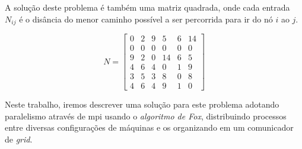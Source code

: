 A solução deste problema é também uma matriz quadrada, onde cada entrada \(N_{ij}\) é o disância do menor caminho
possível a ser percorrida para ir do nó \(i\) ao \(j\).

\[N = 
\begin{bmatrix}
	0 & 2 & 9 & 5  & 6 & 14 \\
	0 & 0 & 0 & 0  & 0 & 0  \\
	9 & 2 & 0 & 14 & 6 & 5  \\
	4 & 6 & 4 & 0  & 1 & 9  \\
	3 & 5 & 3 & 8  & 0 & 8  \\
	4 & 6 & 4 & 9  & 1 & 0
\end{bmatrix}
\]

Neste trabalho, iremos descrever uma solução para este problema adotando paralelismo através de \ac{mpi} usando
o \emph{algoritmo de Fox}, distribuindo processos entre diversas configurações de máquinas e os organizando 
em um comunicador de \emph{grid}.
